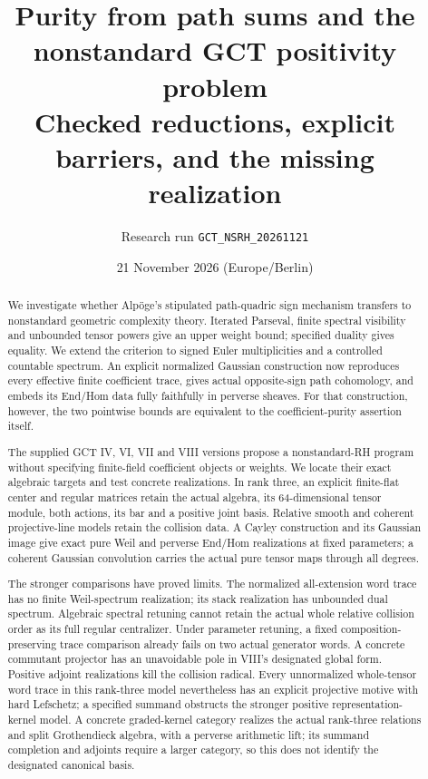 \documentclass[11pt,a4paper]{article}
\title{Purity from path sums and the nonstandard GCT positivity problem\\[4pt]\large Checked reductions, explicit barriers, and the missing realization}
\author{Research run \texttt{GCT\_NSRH\_20261121}}
\date{21 November 2026 (Europe/Berlin)}
\theoremstyle{named}\newtheorem{finding}{Finding}[section]
\theoremstyle{definition}\newtheorem{definition}[finding]{Definition}
\theoremstyle{remark}\newtheorem{remark}[finding]{Remark}
\begin{document}
\maketitle
\begin{abstract}
We investigate whether Alp\"oge's stipulated path-quadric sign mechanism transfers to nonstandard geometric complexity theory. Iterated Parseval, finite spectral visibility and unbounded tensor powers give an upper weight bound; specified duality gives equality. We extend the criterion to signed Euler multiplicities and a controlled countable spectrum. An explicit normalized Gaussian construction now reproduces every effective finite coefficient trace, gives actual opposite-sign path cohomology, and embeds its End/Hom data fully faithfully in perverse sheaves. For that construction, however, the two pointwise bounds are equivalent to the coefficient-purity assertion itself.

The supplied GCT IV, VI, VII and VIII versions propose a nonstandard-RH program without specifying finite-field coefficient objects or weights. We locate their exact algebraic targets and test concrete realizations. In rank three, an explicit finite-flat center and regular matrices retain the actual algebra, its 64-dimensional tensor module, both actions, its bar and a positive joint basis. Relative smooth and coherent projective-line models retain the collision data. A Cayley construction and its Gaussian image give exact pure Weil and perverse End/Hom realizations at fixed parameters; a coherent Gaussian convolution carries the actual pure tensor maps through all degrees.

The stronger comparisons have proved limits. The normalized all-extension word trace has no finite Weil-spectrum realization; its stack realization has unbounded dual spectrum. Algebraic spectral retuning cannot retain the actual whole relative collision order as its full regular centralizer. Under parameter retuning, a fixed composition-preserving trace comparison already fails on two actual generator words. A concrete commutant projector has an unavoidable pole in VIII's designated global form. Positive adjoint realizations kill the collision radical. Every unnormalized whole-tensor word trace in this rank-three model nevertheless has an explicit projective motive with hard Lefschetz; a specified summand obstructs the stronger positive representation-kernel model. A concrete graded-kernel category realizes the actual rank-three relations and split Grothendieck algebra, with a perverse arithmetic lift; its summand completion and adjoints require a larger category, so this does not identify the designated canonical basis.


\end{abstract}
\end{document}
